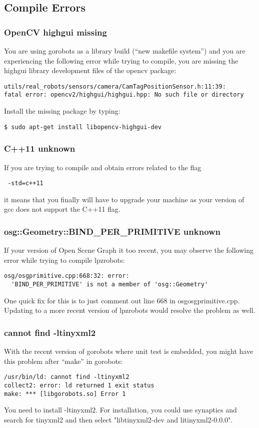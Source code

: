 \subsection{Compile Errors}

\subsubsection{OpenCV highgui missing}
You are using gorobots as a library build (``new makefile system'') and you
are experiencing the following error while trying to compile, you are missing
the highgui library development files of the opencv package:
\begin{lstlisting}
utils/real_robots/sensors/camera/CamTagPositionSensor.h:11:39:
fatal error: opencv2/highgui/highgui.hpp: No such file or directory
\end{lstlisting}
Install the missing package by typing:
\begin{lstlisting}
$ sudo apt-get install libopencv-highgui-dev
\end{lstlisting}

\subsubsection{C++11 unknown}
If you are trying to compile and obtain errors related to the flag
\begin{lstlisting}
 -std=c++11
\end{lstlisting}
it means that you finally will have to upgrade your machine as your version of
gcc does not support the C++11 flag.

\subsubsection{osg::Geometry::BIND\_PER\_PRIMITIVE unknown}
If your version of Open Scene Graph it too recent, you may observe the following
error while trying to compile lpzrobots:
\begin{lstlisting}
osg/osgprimitive.cpp:668:32: error:
  'BIND_PER_PRIMITIVE' is not a member of 'osg::Geometry'
\end{lstlisting}
One quick fix for this is to just comment out line 668 in osg\/osgprimitive.cpp.
Updating to a more recent version of lpzrobots would resolve the problem as
well.


\subsubsection{cannot find -ltinyxml2}
With the recent version of gorobots where unit test is embedded, you might have this problem after ``make'' in gorobots:
\begin{lstlisting}
/usr/bin/ld: cannot find -ltinyxml2
collect2: error: ld returned 1 exit status
make: *** [libgorobots.so] Error 1
\end{lstlisting}
You need to install -ltinyxml2. For installation, you could use synaptics and search for tinyxml2 and then select "libtinyxml2-dev and litinyxml2-0.0.0".


